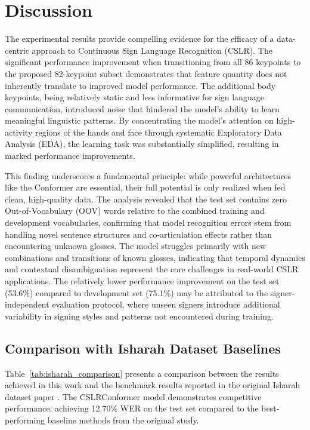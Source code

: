 \section{Discussion}
The experimental results provide compelling evidence for the efficacy of a data-centric approach to Continuous Sign Language Recognition (CSLR). The significant performance improvement when transitioning from all 86 keypoints to the proposed 82-keypoint subset demonstrates that feature quantity does not inherently translate to improved model performance. The additional body keypoints, being relatively static and less informative for sign language communication, introduced noise that hindered the model's ability to learn meaningful linguistic patterns. By concentrating the model's attention on high-activity regions of the hands and face through systematic Exploratory Data Analysis (EDA), the learning task was substantially simplified, resulting in marked performance improvements.

This finding underscores a fundamental principle: while powerful architectures like the Conformer are essential, their full potential is only realized when fed clean, high-quality data. The analysis revealed that the test set contains zero Out-of-Vocabulary (OOV) words \cite{young1994detecting} relative to the combined training and development vocabularies, confirming that model recognition errors stem from handling novel sentence structures and co-articulation effects rather than encountering unknown glosses. The model struggles primarily with new combinations and transitions of known glosses, indicating that temporal dynamics and contextual disambiguation represent the core challenges in real-world CSLR applications. The relatively lower performance improvement on the test set (53.6\%) compared to development set (75.1\%) may be attributed to the signer-independent evaluation protocol, where unseen signers introduce additional variability in signing styles and patterns not encountered during training.

\subsection{Comparison with Isharah Dataset Baselines}
Table~\ref{tab:isharah_comparison} presents a comparison between the results achieved in this work and the benchmark results reported in the original Isharah dataset paper \cite{alyami2025isharahlargescalemultiscenedataset}. The CSLRConformer model demonstrates competitive performance, achieving 12.70\% WER on the test set compared to the best-performing baseline methods from the original study.

